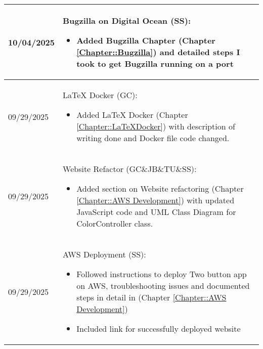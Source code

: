 \begin{longtable}{|l||p{13.5cm}|}
10/04/2025 & Bugzilla on Digital Ocean (SS):
\begin{itemize}[topsep=0pt,itemsep=0pt,parsep=0pt,partopsep=0pt,leftmargin=12pt]
\item Added Bugzilla Chapter (Chapter \ref{Chapter::Bugzilla}) and detailed steps I took to get Bugzilla running on a port 
\end{itemize} 
\\ \hline

09/29/2025 & LaTeX Docker (GC):
\begin{itemize}[topsep=0pt,itemsep=0pt,parsep=0pt,partopsep=0pt,leftmargin=12pt]
\item Added LaTeX Docker (Chapter \ref{Chapter::LaTeXDocker}) with description of writing done and Docker file code changed.
\end{itemize} 
\\ \hline

09/29/2025 & Website Refactor (GC\&JB\&TU\&SS):
\begin{itemize}[topsep=0pt,itemsep=0pt,parsep=0pt,partopsep=0pt,leftmargin=12pt]
\item Added section on Website refactoring (Chapter \ref{Chapter::AWS Development}) with updated JavaScript code and UML Class Diagram for ColorController class.
\end{itemize} 
\\ \hline

09/29/2025 & AWS Deployment (SS):
\begin{itemize}[topsep=0pt,itemsep=0pt,parsep=0pt,partopsep=0pt,leftmargin=12pt]
\item Followed instructions to deploy Two button app on AWS, troubleshooting issues and documented steps in detail in (Chapter \ref{Chapter::AWS Development})
\item Included link for successfully deployed website
\end{itemize} 
\\ \hline




\end{longtable}
